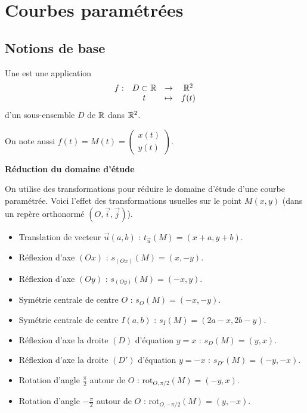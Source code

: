 \documentclass[10pt,class=article,crop=false]{standalone}
\begin{document}
	
\section{Courbes paramétrées}

\begin{multicols}{2}


\subsection{Notions de base}

Une  est une application
$$\begin{array}[t]{cccc}
	f :&D\subset\mathbb{R}&\rightarrow&\mathbb{R}^2\\
	&t&\mapsto&f(t)
\end{array}$$ d'un sous-ensemble $D$ de $\mathbb{R}$ dans $\mathbb{R}^2$.

On note aussi $f(t) = M(t) = \left(
\begin{smallmatrix}
	x(t)\\
	y(t)
\end{smallmatrix}
\right)$.




\textbf{Réduction du domaine d'étude}

On utilise des transformations pour réduire le domaine
d'étude d'une courbe paramétrée.
Voici l'effet des transformations usuelles sur le point $M(x,y)$ (dans un repère orthonormé $(O,\vec{i},\vec{j})$).

\begin{itemize}
	\item Translation de vecteur $\vec{u}(a,b)$ : $t_{\vec{u}}(M)=(x+a,y+b)$.
	\item Réflexion d'axe $(Ox)$ : $s_{(Ox)}(M)=(x,-y)$.
	\item Réflexion d'axe $(Oy)$ : $s_{(Oy)}(M)=(-x,y)$.
	\item Symétrie centrale de centre $O$ : $s_O(M)=(-x,-y)$.
	\item Symétrie centrale de centre $I(a,b)$ : $s_I(M)=(2a-x,2b-y)$.
	\item Réflexion d'axe la droite $(D)$ d'équation $y=x$ : $s_D(M)=(y,x)$.
	\item Réflexion d'axe la droite $(D')$ d'équation $y=-x$ : $s_{D'}(M)=(-y,-x)$.
	\item Rotation d'angle $\frac{\pi}{2}$ autour de $O$ : $\text{rot}_{O,\pi/2}(M)=(-y,x)$.
	\item Rotation d'angle $-\frac{\pi}{2}$ autour de $O$ : $\text{rot}_{O,-\pi/2}(M)=(y,-x)$.
\end{itemize}



\end{multicols}
\end{document}
